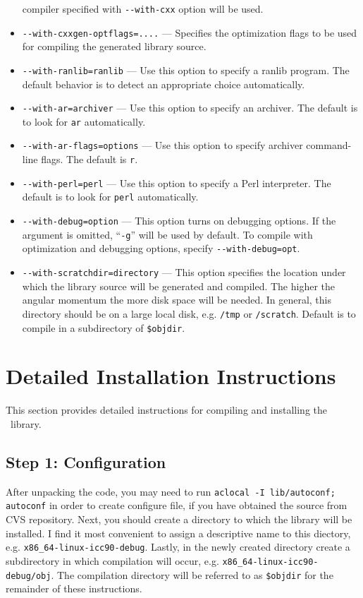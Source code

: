 \documentclass[12pt]{article}
\begin{document}
\begin{itemize}
  compiler specified with {\tt -}{\tt -with-cxx} option will be used.
\item {\tt -}{\tt -with-cxxgen-optflags=....} --- Specifies the optimization flags to be
  used for compiling the generated library source. 
\item {\tt -}{\tt -with-ranlib=ranlib} --- Use this option to specify
  a ranlib program. The default behavior is to detect an appropriate
  choice automatically.
\item {\tt -}{\tt -with-ar=archiver} --- Use this option to specify an
  archiver.  The default is to look for {\tt ar} automatically.
\item {\tt -}{\tt -with-ar-flags=options} --- Use this option to specify
  archiver command-line flags. The default is {\tt r}.
\item {\tt -}{\tt -with-perl=perl} --- Use this option to specify a
  Perl interpreter.  The default is to look for {\tt perl} automatically.
\item {\tt -}{\tt -with-debug=option} --- This option turns on debugging
  options.  If the argument is omitted, ``{\tt -g}'' will be used by default.
  To compile with optimization and debugging options, specify {\tt -}{\tt -with-debug=opt}.
\item {\tt -}{\tt -with-scratchdir=directory} --- This option specifies the location
  under which the library source will be generated and compiled. The higher the angular
  momentum the more disk space will be needed. In general, this directory should be
  on a large local disk, e.g. {\tt /tmp} or {\tt /scratch}. Default is to compile
  in a subdirectory of {\tt \$objdir}.
\end{itemize}

\section{Detailed Installation Instructions}

This section provides detailed instructions for compiling and
installing the \LIBINT\ library.  

\subsection{Step 1: Configuration}

After unpacking the code, you may need to run {\tt aclocal -I lib/autoconf; autoconf}
in order to create configure file, if you have obtained the source from CVS repository.
Next, you should create a directory to which the library will be installed.
I find it most convenient to assign a descriptive name to this diectory, e.g.
{\tt x86\_64-linux-icc90-debug}. Lastly, in the newly created directory
create a subdirectory in which compilation will occur, e.g.
{\tt x86\_64-linux-icc90-debug/obj}. The compilation directory will be referred to as {\tt \$objdir}
for the remainder of these instructions.
\end{document}
